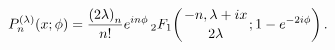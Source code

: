 \[\mathop{P^{(\lambda)}_{n}\/}\nolimits\!\left(x;\phi\right)=\frac{\left(2%
\lambda\right)_{n}}{n!}e^{in\phi}\*\mathop{{{}_{2}F_{1}}\/}\nolimits\!\left({-%
n,\lambda+ix\atop 2\lambda};1-e^{-2i\phi}\right).\]